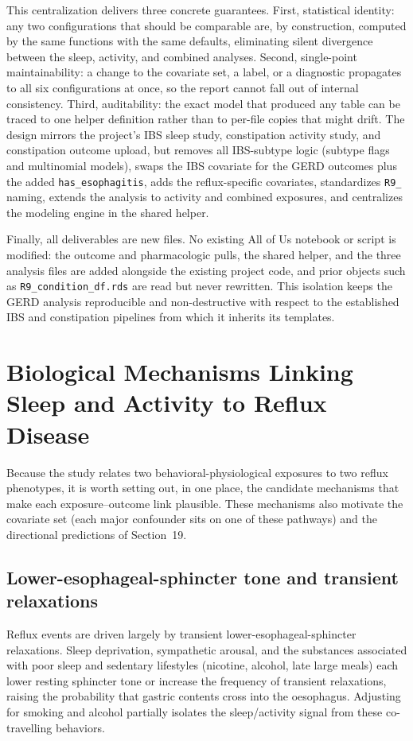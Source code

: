 \documentclass[11pt]{article}
\newcommand{\code}[1]{\texttt{\small #1}}
\begin{document}
This centralization delivers three concrete guarantees. First, statistical identity: any two
configurations that should be comparable are, by construction, computed by the same functions with the
same defaults, eliminating silent divergence between the sleep, activity, and combined analyses.
Second, single-point maintainability: a change to the covariate set, a label, or a diagnostic
propagates to all six configurations at once, so the report cannot fall out of internal consistency.
Third, auditability: the exact model that produced any table can be traced to one helper definition
rather than to per-file copies that might drift. The design mirrors the project's IBS sleep study,
constipation activity study, and constipation outcome upload, but removes all IBS-subtype logic
(subtype flags and multinomial models), swaps the IBS covariate for the GERD outcomes plus the added
\code{has_esophagitis}, adds the reflux-specific covariates, standardizes \code{R9_}
naming, extends the analysis to activity and combined exposures, and centralizes the modeling engine
in the shared helper.

Finally, all deliverables are new files. No existing All of Us notebook or script is modified: the
outcome and pharmacologic pulls, the shared helper, and the three analysis files are added alongside
the existing project code, and prior objects such as \code{R9_condition_df.rds} are read but never
rewritten. This isolation keeps the GERD analysis reproducible and non-destructive with respect to the
established IBS and constipation pipelines from which it inherits its templates.%
\section{Biological Mechanisms Linking Sleep and Activity to Reflux Disease}
Because the study relates two behavioral-physiological exposures to two reflux phenotypes, it is worth
setting out, in one place, the candidate mechanisms that make each exposure--outcome link plausible.
These mechanisms also motivate the covariate set (each major confounder sits on one of these pathways)
and the directional predictions of Section~19.

\subsection{Lower-esophageal-sphincter tone and transient relaxations}
Reflux events are driven largely by transient lower-esophageal-sphincter relaxations. Sleep
deprivation, sympathetic arousal, and the substances associated with poor sleep and sedentary lifestyles
(nicotine, alcohol, late large meals) each lower resting sphincter tone or increase the frequency of
transient relaxations, raising the probability that gastric contents cross into the oesophagus. Adjusting
for smoking and alcohol partially isolates the sleep/activity signal from these co-travelling behaviors.
\end{document}

